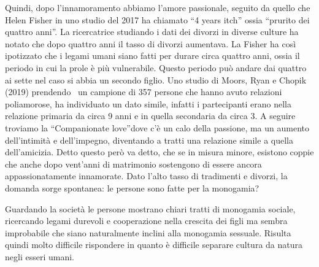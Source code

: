 \documentclass[12pt]{book} %
\begin{document}
Quindi, dopo l'innamoramento abbiamo l'amore passionale, seguito da quello che
Helen Fisher in uno studio del 2017 ha chiamato “4 years itch” ossia “prurito dei quattro anni”. La ricercatrice
studiando i dati dei divorzi in diverse culture ha notato che dopo quattro anni il tasso di divorzi aumentava. La
Fisher ha così ipotizzato che i legami umani siano fatti per durare circa quattro anni, ossia il periodo in cui la
prole è più vulnerabile. Questo periodo può andare dai quattro ai sette nel caso si abbia un secondo figlio. Uno studio
di Moors, Ryan e Chopik (2019) prendendo \ un campione di 357 persone che hanno avuto relazioni poliamorose, ha
individuato un dato simile, infatti i partecipanti erano nella relazione primaria da circa 9 anni e in quella
secondaria da circa 3. A seguire troviamo la “Companionate love”dove c'è un calo della passione,
ma un aumento dell'intimità e dell'impegno, diventando a tratti una relazione
simile a quella dell'amicizia. Detto questo però va detto, che se in misura minore, esistono
coppie che anche dopo vent'anni di matrimonio sostengono di essere ancora appassionatamente
innamorate. Dato l'alto tasso di tradimenti e divorzi, la domanda sorge spontanea: le persone sono
fatte per la monogamia?

Guardando la società le persone mostrano chiari tratti di monogamia sociale, ricercando legami durevoli e cooperazione
nella crescita dei figli ma sembra improbabile che siano naturalmente inclini alla monogamia sessuale. Risulta quindi
molto difficile rispondere in quanto è difficile separare cultura da natura negli esseri umani.
\end{document}
